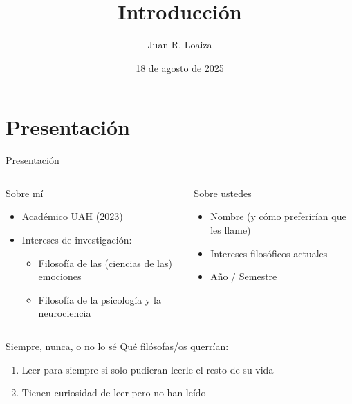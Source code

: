 \documentclass[%
            9pt,
                spanish, %
                    ignorenonframetext,
                aspectratio=169, %
        ]{beamer}
\title{Introducción}
\author{Juan R. Loaiza}
\date{18 de agosto de 2025}
\institute{Departamento de Filosofía · Universidad Alberto Hurtado}
\providecommand{\tightlist}{}
\begin{document}

\frame{\titlepage}









\section{Presentación}\label{presentaciuxf3n}

\begin{frame}{Presentación}
\begin{columns}[T,onlytextwidth]
\begin{column}{0.48\linewidth}
\begin{block}{Sobre mí}
\protect{}\label{sobre-muxed}
\begin{itemize}
\tightlist
\item
  Académico UAH (2023)
\item
  Intereses de investigación:

  \begin{itemize}
  \tightlist
  \item
    Filosofía de las (ciencias de las) emociones
  \item
    Filosofía de la psicología y la neurociencia
  \end{itemize}
\end{itemize}
\end{block}
\end{column}

\begin{column}{0.48\linewidth}
\begin{block}{Sobre ustedes}
\protect{}\label{sobre-ustedes}
\begin{itemize}
\tightlist
\item
  Nombre (y cómo preferirían que les llame)
\item
  Intereses filosóficos actuales
\item
  Año / Semestre
\end{itemize}
\end{block}
\end{column}
\end{columns}

\begin{block}{Siempre, nunca, o no lo sé}
\protect{}\label{siempre-nunca-o-no-lo-suxe9}
Qué filósofas/os querrían:

\begin{enumerate}
\tightlist
\item
  Leer para siempre si solo pudieran leerle el resto de su vida
\item
  Tienen curiosidad de leer pero no han leído
\end{enumerate}
\end{block}
\end{frame}
\end{document}
